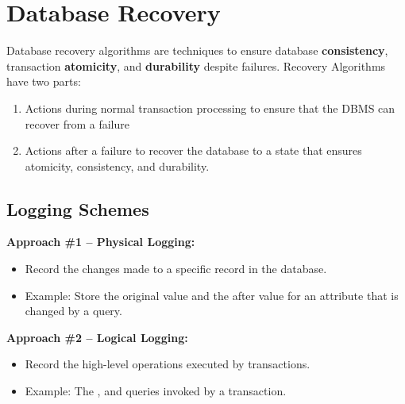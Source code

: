 \documentclass[11pt]{article}
\begin{document}
\maketitle
\thispagestyle{plain}

\section{Database Recovery}
Database recovery algorithms are techniques to ensure database \textbf{consistency}, transaction 
\textbf{atomicity}, and \textbf{durability} despite failures.
Recovery Algorithms have two parts:
\begin{enumerate}
    \item
    Actions during normal transaction processing to ensure that the DBMS can recover from a failure
    
    \item
    Actions after a failure to recover the database to a state that ensures atomicity, 
    consistency, and durability.
\end{enumerate}

\subsection{Logging Schemes}

\textbf{Approach \#1 -- Physical Logging:}
\begin{itemize}
    \item
    Record the changes made to a specific record in the database.
    
    \item
    Example: Store the original value and the after value for an attribute that is changed by 
    a query.
\end{itemize}

\textbf{Approach \#2 -- Logical Logging:}
\begin{itemize}
    \item
    Record the high-level operations executed by transactions.
    
    \item
    Example: The ,  and  queries invoked by a transaction.
\end{itemize}
\end{document}
